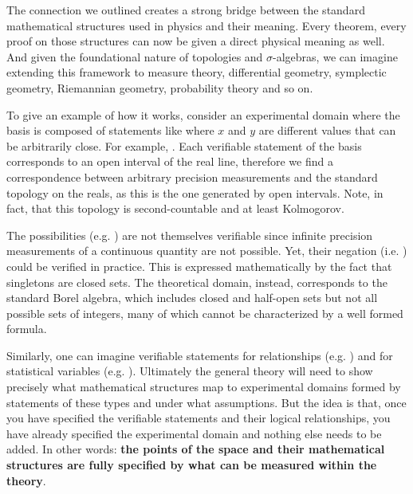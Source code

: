 \documentclass[twocolumn]{article}
\begin{document}
The connection we outlined creates a strong bridge between the standard mathematical structures used in physics and their meaning. Every theorem, every proof on those structures can now be given a direct physical meaning as well. And given the foundational nature of topologies and $\sigma$-algebras, we can imagine extending this framework to measure theory, differential geometry, symplectic geometry, Riemannian geometry, probability theory and so on.

To give an example of how it works, consider an experimental domain where the basis is composed of statements like  where $x$ and $y$ are different values that can be arbitrarily close. For example, . Each verifiable statement of the basis corresponds to an open interval of the real line, therefore we find a correspondence between arbitrary precision measurements and the standard topology on the reals, as this is the one generated by open intervals. Note, in fact, that this topology is second-countable and at least Kolmogorov.

The possibilities (e.g. ) are not themselves verifiable since infinite precision measurements of a continuous quantity are not possible. Yet, their negation (i.e. ) could be verified in practice. This is expressed mathematically by the fact that singletons are closed sets. The theoretical domain, instead, corresponds to the standard Borel algebra, which includes closed and half-open sets but not all possible sets of integers, many of which cannot be characterized by a well formed formula.

Similarly, one can imagine verifiable statements for relationships (e.g. ) and for statistical variables (e.g. ). Ultimately the general theory will need to show precisely what mathematical structures map to experimental domains formed by statements of these types and under what assumptions. But the idea is that, once you have specified the verifiable statements and their logical relationships, you have already specified the experimental domain and nothing else needs to be added. In other words: \textbf{the points of the space and their mathematical structures are fully specified by what can be measured within the theory}.
\end{document}
